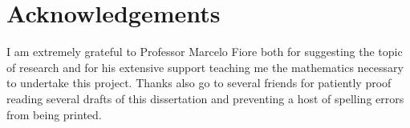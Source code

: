 \chapter*{\centering Acknowledgements}
I am extremely grateful to Professor Marcelo Fiore both for suggesting the topic
of research and for his extensive support teaching me the mathematics necessary
to undertake this project. Thanks also go to several friends for patiently proof
reading several drafts of this dissertation and preventing a host of spelling
errors from being printed.